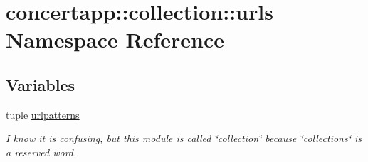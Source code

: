\hypertarget{namespaceconcertapp_1_1collection_1_1urls}{
\section{concertapp::collection::urls Namespace Reference}
\label{namespaceconcertapp_1_1collection_1_1urls}
}
\subsection*{Variables}
\begin{DoxyCompactItemize}
\item 
tuple \hyperlink{namespaceconcertapp_1_1collection_1_1urls_a8e6a29df84966d5e5696d08fb5adec62}{urlpatterns}
\begin{DoxyCompactList}\small\item\em I know it is confusing, but this module is called \char`\"{}collection\char`\"{} because \char`\"{}collections\char`\"{} is a reserved word. \item\end{DoxyCompactList}\end{DoxyCompactItemize}



